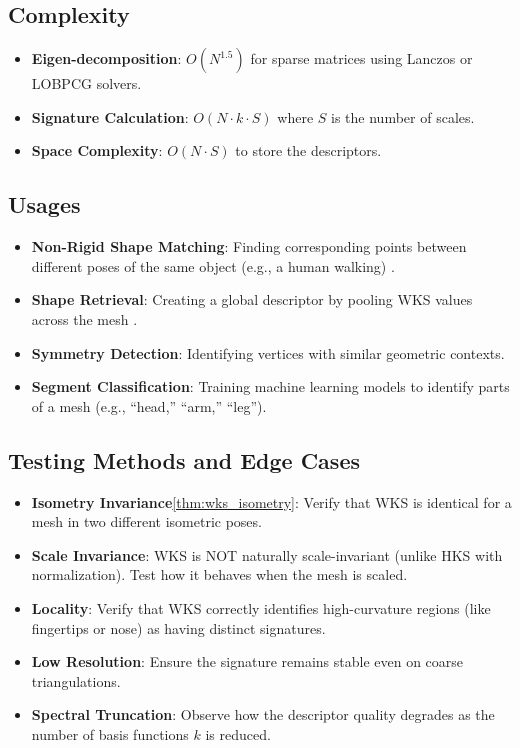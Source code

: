 \subsection{Complexity}
\begin{itemize}
  \item \textbf{Eigen-decomposition}: $O(N^{1.5})$ for sparse matrices using Lanczos or LOBPCG solvers.
  \item \textbf{Signature Calculation}: $O(N \cdot k \cdot S)$ where $S$ is the number of scales.
  \item \textbf{Space Complexity}: $O(N \cdot S)$ to store the descriptors.
\end{itemize}

\subsection{Usages}
\begin{itemize}
  \item \textbf{Non-Rigid Shape Matching}: Finding corresponding points between different poses of the same object (e.g., a human walking) \cite{aubry2011}.
  \item \textbf{Shape Retrieval}: Creating a global descriptor by pooling WKS values across the mesh \cite{bronstein2008}.
  \item \textbf{Symmetry Detection}: Identifying vertices with similar geometric contexts.
  \item \textbf{Segment Classification}: Training machine learning models to identify parts of a mesh (e.g., ``head,'' ``arm,'' ``leg'').
\end{itemize}

\subsection{Testing Methods and Edge Cases}
\begin{itemize}
  \item \textbf{Isometry Invariance}\cref{thm:wks_isometry}: Verify that WKS is identical for a mesh in two different isometric poses.
  \item \textbf{Scale Invariance}: WKS is NOT naturally scale-invariant (unlike HKS with normalization). Test how it behaves when the mesh is scaled.
  \item \textbf{Locality}: Verify that WKS correctly identifies high-curvature regions (like fingertips or nose) as having distinct signatures.
  \item \textbf{Low Resolution}: Ensure the signature remains stable even on coarse triangulations.
  \item \textbf{Spectral Truncation}: Observe how the descriptor quality degrades as the number of basis functions $k$ is reduced.
\end{itemize}

